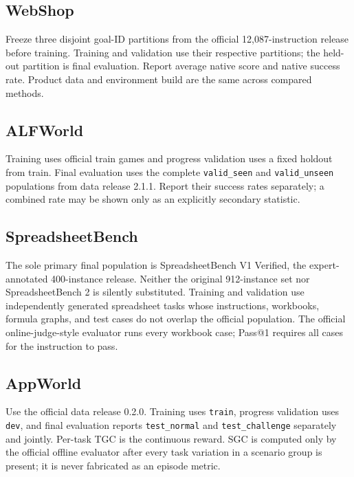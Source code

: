 \documentclass[11pt]{article}
\begin{document}
\subsection{WebShop}

Freeze three disjoint goal-ID partitions from the official 12,087-instruction
release before training.  Training and validation use their respective
partitions; the held-out partition is final evaluation.  Report average native
score and native success rate.  Product data and environment build are the
same across compared methods.

\subsection{ALFWorld}

Training uses official train games and progress validation uses a fixed
holdout from train.  Final evaluation uses the complete
\texttt{valid\_seen} and \texttt{valid\_unseen} populations from data release
2.1.1.  Report their success rates separately; a combined rate may be shown
only as an explicitly secondary statistic.

\subsection{SpreadsheetBench}

The sole primary final population is SpreadsheetBench V1 Verified, the
expert-annotated 400-instance release.  Neither the original 912-instance set
nor SpreadsheetBench 2 is silently substituted.  Training and validation use
independently generated spreadsheet tasks whose instructions, workbooks,
formula graphs, and test cases do not overlap the official population.  The
official online-judge-style evaluator runs every workbook case; Pass@1 requires
all cases for the instruction to pass.

\subsection{AppWorld}

Use the official data release 0.2.0.  Training uses \texttt{train}, progress
validation uses \texttt{dev}, and final evaluation reports
\texttt{test\_normal} and \texttt{test\_challenge} separately and jointly.
Per-task TGC is the continuous reward.  SGC is computed only by the official
offline evaluator after every task variation in a scenario group is present;
it is never fabricated as an episode metric.
\end{document}
